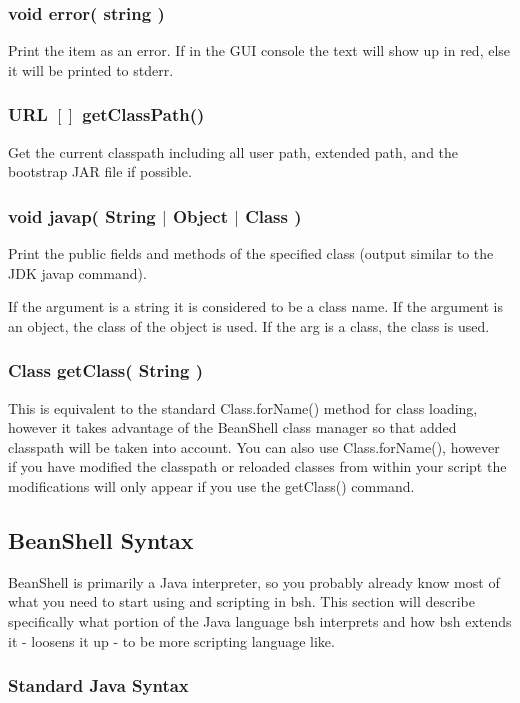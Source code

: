 \documentclass[twoside,11pt]{article}
\renewcommand{\_}{\texttt{\symbol{95}}}
\begin{document}
\subsubsection*{void error( string )}
Print the item as an error.  If in the GUI console the text will show up in
red, else it will be printed to stderr.

\subsubsection*{URL $[]$ getClassPath()}
Get the current classpath including all user path, extended path, and the
bootstrap JAR file if possible.

\subsubsection*{void javap( String $|$ Object $|$ Class )}
Print the public fields and methods of the specified class (output similar
to the JDK javap command).

If the argument is a string it is considered to be a class name.
If the argument is an object, the class of the object is used.
If the arg is a class, the class is used.

\subsubsection*{Class getClass( String )}
This is equivalent to the standard Class.forName() method for class loading,
however it takes advantage of the BeanShell class manager so that added
classpath will be taken into account.  You can also use Class.forName(),
however if you have modified the classpath or reloaded classes from within your
script the modifications will only appear if you use the getClass() command.


\subsection{BeanShell Syntax}

BeanShell is primarily a Java interpreter, so you probably already know
most of what you need to start using and scripting in bsh.  This section
will describe specifically what portion of the Java language bsh interprets
and how bsh extends it - loosens it up - to be more scripting language like.

\subsubsection{Standard Java Syntax}
\end{document}
